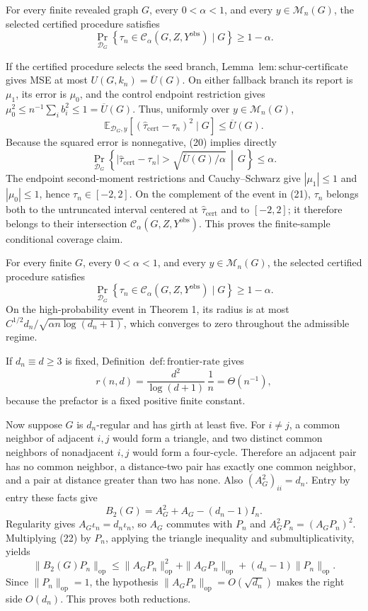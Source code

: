 For every finite revealed graph \(G\), every \(0<\alpha<1\), and every \(y\in\mathcal M_n(G)\), the selected certified procedure satisfies
\[
\Pr_{\mathcal D_G}\!\left\{\tau_n\in\mathcal C_\alpha(G,Z,Y^{\mathrm{obs}})\mid G\right\}\ge1-\alpha.
\]

If the certified procedure selects the seed branch, Lemma~\(\mathrm{lem{:}schur\mbox{-}certificate}\) gives MSE at most \(U(G,k_n)=\overline U(G)\).  On either fallback branch its report is \(\mu_1\), its error is \(\mu_0\), and the control endpoint restriction gives \(\mu_0^2\le n^{-1}\sum_i b_i^2\le1=\overline U(G)\).  Thus, uniformly over \(y\in\mathcal M_n(G)\),
\[
\mathbb E_{\mathcal D_G,y}\!\left[(\widehat\tau_{\mathrm{cert}}-\tau_n)^2\mid G\right]\le\overline U(G).
\tag{20}
\]
Because the squared error is nonnegative, (20) implies directly
\[
\Pr_{\mathcal D_G}\!\left\{|\widehat\tau_{\mathrm{cert}}-\tau_n|>\sqrt{\overline U(G)/\alpha}\,\middle|\,G\right\}
\le\alpha.
\tag{21}
\]
The endpoint second-moment restrictions and Cauchy--Schwarz give \(|\mu_1|\le1\) and \(|\mu_0|\le1\), hence \(\tau_n\in[-2,2]\).  On the complement of the event in (21), \(\tau_n\) belongs both to the untruncated interval centered at \(\widehat\tau_{\mathrm{cert}}\) and to \([-2,2]\); it therefore belongs to their intersection \(\mathcal C_\alpha(G,Z,Y^{\mathrm{obs}})\).  This proves the finite-sample conditional coverage claim.

For every finite \(G\), every \(0<\alpha<1\), and every \(y\in\mathcal M_n(G)\), the selected certified procedure satisfies
\[
\Pr_{\mathcal D_G}\!\left\{\tau_n\in\mathcal C_\alpha(G,Z,Y^{\mathrm{obs}})\mid G\right\}\ge1-\alpha.
\]
On the high-probability event in Theorem 1, its radius is at most \(C^{1/2}d_n/\sqrt{\alpha n\log(d_n+1)}\), which converges to zero throughout the admissible regime.

If \(d_n\equiv d\ge3\) is fixed, Definition~\(\mathrm{def{:}frontier\mbox{-}rate}\) gives
\[
r(n,d)=\frac{d^2}{\log(d+1)}\,\frac1n=\Theta(n^{-1}),
\]
because the prefactor is a fixed positive finite constant.

Now suppose \(G\) is \(d_n\)-regular and has girth at least five.  For \(i\ne j\), a common neighbor of adjacent \(i,j\) would form a triangle, and two distinct common neighbors of nonadjacent \(i,j\) would form a four-cycle.  Therefore an adjacent pair has no common neighbor, a distance-two pair has exactly one common neighbor, and a pair at distance greater than two has none.  Also \((A_G^2)_{ii}=d_n\).  Entry by entry these facts give
\[
B_2(G)=A_G^2+A_G-(d_n-1)I_n.
\tag{22}
\]
Regularity gives \(A_G\iota_n=d_n\iota_n\), so \(A_G\) commutes with \(P_n\) and \(A_G^2P_n=(A_GP_n)^2\).  Multiplying (22) by \(P_n\), applying the triangle inequality and submultiplicativity, yields
\[
\|B_2(G)P_n\|_{\mathrm{op}}
\le\|A_GP_n\|_{\mathrm{op}}^2+\|A_GP_n\|_{\mathrm{op}}+(d_n-1)\|P_n\|_{\mathrm{op}}.
\]
Since \(\|P_n\|_{\mathrm{op}}=1\), the hypothesis \(\|A_GP_n\|_{\mathrm{op}}=O(\sqrt{d_n})\) makes the right side \(O(d_n)\).  This proves both reductions.

